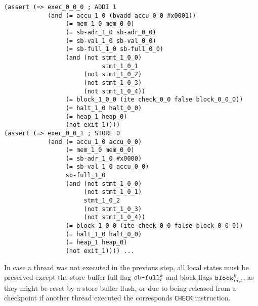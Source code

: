 \begin{lstlisting}[language=smtlib]
(assert (=> exec_0_0_0 ; ADDI 1
            (and (= accu_1_0 (bvadd accu_0_0 #x0001))
                 (= mem_1_0 mem_0_0)
                 (= sb-adr_1_0 sb-adr_0_0)
                 (= sb-val_1_0 sb-val_0_0)
                 (= sb-full_1_0 sb-full_0_0)
                 (and (not stmt_1_0_0)
                           stmt_1_0_1
                      (not stmt_1_0_2)
                      (not stmt_1_0_3)
                      (not stmt_1_0_4))
                 (= block_1_0_0 (ite check_0_0 false block_0_0_0))
                 (= halt_1_0 halt_0_0)
                 (= heap_1 heap_0)
                 (not exit_1))))
(assert (=> exec_0_0_1 ; STORE 0
            (and (= accu_1_0 accu_0_0)
                 (= mem_1_0 mem_0_0)
                 (= sb-adr_1_0 #x0000)
                 (= sb-val_1_0 accu_0_0)
                 sb-full_1_0
                 (and (not stmt_1_0_0)
                      (not stmt_1_0_1)
                      stmt_1_0_2
                      (not stmt_1_0_3)
                      (not stmt_1_0_4))
                 (= block_1_0_0 (ite check_0_0 false block_0_0_0))
                 (= halt_1_0 halt_0_0)
                 (= heap_1 heap_0)
                 (not exit_1)))) ...
\end{lstlisting}


\noindent
In case a thread was not executed in the previous step, all local states must be preserved except the store buffer full flag $\texttt{sb-full}^k_t$ and block flags $\texttt{block}^k_{id, t}$, as they might be reset by a store buffer flush, or due to being released from a checkpoint if another thread executed the corresponds \lstinline[language={[concubine]Assembler}]{CHECK} instruction.

